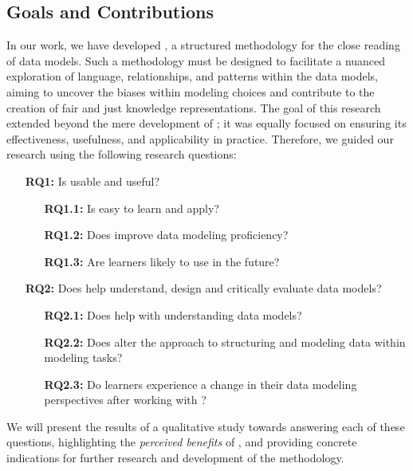 \subsection{Goals and Contributions}
In our work, we have developed \credal, a structured methodology for the close reading of data models.  Such a methodology must be designed to facilitate a nuanced exploration of language, relationships, and patterns within the data models, aiming to uncover the biases within modeling choices and contribute to the creation of fair and just knowledge representations.
The goal of this research extended beyond the mere development of \credal; it was equally focused on ensuring its effectiveness, usefulness, and applicability in practice. Therefore, we guided our research using the following research questions:

\begin{enumerate}
    \item [\textbf{RQ1:}] Is \credal usable and useful? 
    \begin{enumerate}
        \item [\textbf{RQ1.1:}] Is \credal easy to learn and apply?
        \item [\textbf{RQ1.2:}] Does \credal improve data modeling proficiency?
        \item [\textbf{RQ1.3:}] Are learners likely to use \credal in the future?
    \end{enumerate}
    \item [\textbf{RQ2:}] Does \credal help understand, design and critically evaluate data models?

        \begin{enumerate}
            \item [\textbf{RQ2.1:}] Does \credal help with understanding data models?
            \item [\textbf{RQ2.2:}] Does \credal alter the approach to structuring and modeling data within modeling tasks?
            \item [\textbf{RQ2.3:}] Do learners experience a change 
            in their data modeling perspectives after working with \credal?
        \end{enumerate}
\end{enumerate}

We will present the results of a qualitative study towards answering each of these questions,  highlighting the \emph{perceived benefits} of \credal, and providing concrete indications for further research and development of the methodology. 
